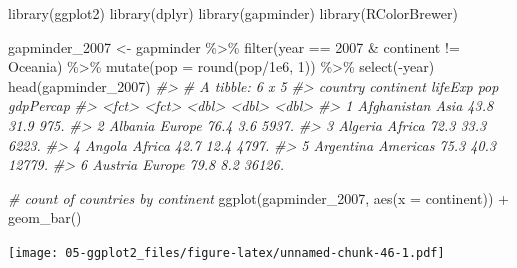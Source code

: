 \documentclass[
]{book}
\newenvironment{Shaded}{\begin{snugshade}}{\end{snugshade}}
\newcommand{\AttributeTok}[1]{\textcolor[rgb]{0.77,0.63,0.00}{#1}}
\newcommand{\CommentTok}[1]{\textcolor[rgb]{0.56,0.35,0.01}{\textit{#1}}}
\newcommand{\DecValTok}[1]{\textcolor[rgb]{0.00,0.00,0.81}{#1}}
\newcommand{\FloatTok}[1]{\textcolor[rgb]{0.00,0.00,0.81}{#1}}
\newcommand{\FunctionTok}[1]{\textcolor[rgb]{0.00,0.00,0.00}{#1}}
\newcommand{\NormalTok}[1]{#1}
\newcommand{\OtherTok}[1]{\textcolor[rgb]{0.56,0.35,0.01}{#1}}
\newcommand{\SpecialCharTok}[1]{\textcolor[rgb]{0.00,0.00,0.00}{#1}}
\newcommand{\StringTok}[1]{\textcolor[rgb]{0.31,0.60,0.02}{#1}}
\begin{document}
\begin{Shaded}
\begin{Highlighting}[]
\FunctionTok{library}\NormalTok{(ggplot2)}
\FunctionTok{library}\NormalTok{(dplyr)}
\FunctionTok{library}\NormalTok{(gapminder)}
\FunctionTok{library}\NormalTok{(RColorBrewer)}

\NormalTok{gapminder\_2007 }\OtherTok{\textless{}{-}} 
\NormalTok{gapminder }\SpecialCharTok{\%\textgreater{}\%}
\FunctionTok{filter}\NormalTok{(year }\SpecialCharTok{==} \StringTok{\textquotesingle{}2007\textquotesingle{}} \SpecialCharTok{\&}\NormalTok{ continent }\SpecialCharTok{!=} \StringTok{\textquotesingle{}Oceania\textquotesingle{}}\NormalTok{) }\SpecialCharTok{\%\textgreater{}\%}
\FunctionTok{mutate}\NormalTok{(}\AttributeTok{pop =} \FunctionTok{round}\NormalTok{(pop}\SpecialCharTok{/}\FloatTok{1e6}\NormalTok{, }\DecValTok{1}\NormalTok{)) }\SpecialCharTok{\%\textgreater{}\%}
\FunctionTok{select}\NormalTok{(}\SpecialCharTok{{-}}\NormalTok{year)}
\FunctionTok{head}\NormalTok{(gapminder\_2007)}
\CommentTok{\#\textgreater{} \# A tibble: 6 x 5}
\CommentTok{\#\textgreater{}   country     continent lifeExp   pop gdpPercap}
\CommentTok{\#\textgreater{}   \textless{}fct\textgreater{}       \textless{}fct\textgreater{}       \textless{}dbl\textgreater{} \textless{}dbl\textgreater{}     \textless{}dbl\textgreater{}}
\CommentTok{\#\textgreater{} 1 Afghanistan Asia         43.8  31.9      975.}
\CommentTok{\#\textgreater{} 2 Albania     Europe       76.4   3.6     5937.}
\CommentTok{\#\textgreater{} 3 Algeria     Africa       72.3  33.3     6223.}
\CommentTok{\#\textgreater{} 4 Angola      Africa       42.7  12.4     4797.}
\CommentTok{\#\textgreater{} 5 Argentina   Americas     75.3  40.3    12779.}
\CommentTok{\#\textgreater{} 6 Austria     Europe       79.8   8.2    36126.}

\CommentTok{\# count of countries by continent}
\FunctionTok{ggplot}\NormalTok{(gapminder\_2007, }\FunctionTok{aes}\NormalTok{(}\AttributeTok{x =}\NormalTok{ continent)) }\SpecialCharTok{+} 
   \FunctionTok{geom\_bar}\NormalTok{()}
\end{Highlighting}
\end{Shaded}

\texttt{[image: 05-ggplot2\_files/figure-latex/unnamed-chunk-46-1.pdf]}
\end{document}

